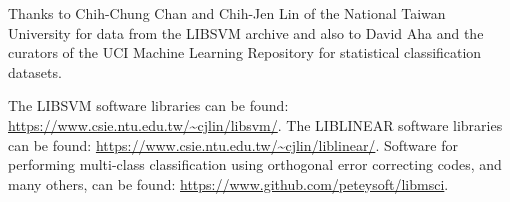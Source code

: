 
\author{Peter Mills}



\date{Received: date / Accepted: date}


\maketitle

\begin{abstract}
	
\end{abstract}



\appendix

\begin{acknowledgements}
Thanks to Chih-Chung Chan and Chih-Jen Lin of the National Taiwan University
for data from the LIBSVM archive and also to David Aha and the curators of
the UCI Machine Learning Repository for statistical classification datasets.

	The LIBSVM software libraries can be found: \url{https://www.csie.ntu.edu.tw/~cjlin/libsvm/}. 
	The LIBLINEAR software libraries can be found: \url{https://www.csie.ntu.edu.tw/~cjlin/liblinear/}. 
	Software for performing multi-class classification using orthogonal error correcting codes, and many others, can be found: \url{https://www.github.com/peteysoft/libmsci}.

\end{acknowledgements}

%


%



